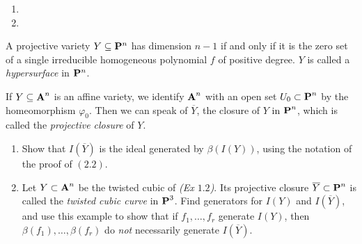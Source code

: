 \documentclass[10pt]{amsart}
\begin{document}
\begin{solution}
    \begin{enumerate}
        \item {}
        \item 
    \end{enumerate}
\end{solution}

\begin{exercise}[2.8]
    A projective variety $Y \subseteq \bbP^n$ has dimension $n-1$ if
    and only if it is the zero set of a single irreducible homogeneous polynomial
    $f$ of positive degree. $Y$ is called a \emph{hypersurface} in $\bbP^n$.   
\end{exercise}

\begin{solution}
\end{solution}

\begin{exercise}[2.9]
    If $Y \subseteq \aa^n$ is an affine variety, we identify $\aa^n$ with an open
    set $U_0 \subset \pp^n$ by the homeomorphism $\varphi_0$. Then we can speak of
    $\overline{Y}$, the closure of $Y$ in $\pp^n$, which is called the
    \emph{projective closure} of $Y$. 
   \begin{enumerate}
     \item Show that $I(\overline{Y})$ is the ideal generated by $\beta(I(Y))$,
       using the notation of the proof of $(2.2)$. 
     \item Let $Y \subset \aa^n$ be the twisted cubic of \emph{(Ex $1.2$)}. Its
       projective closure $\overline{Y} \subset \pp^n$ is called the \emph{twisted
       cubic curve} in $\pp^3$. Find generators for $I(Y)$ and $I(\overline{Y})$,
       and use this example to show that if $f_1, \ldots, f_r$ generate $I(Y)$,
       then $\beta(f_1), \ldots, \beta(f_r)$ do \emph{not} necessarily generate
       $I(\overline{Y})$. 
   \end{enumerate}
\end{exercise}
\end{document}

